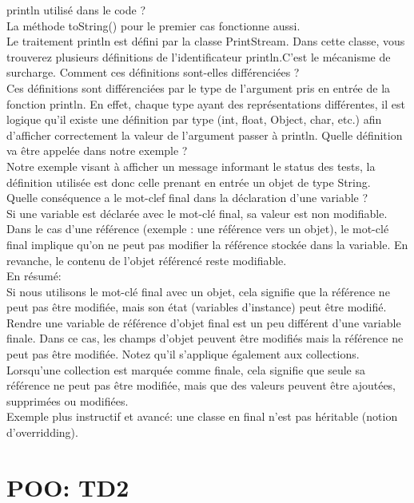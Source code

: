 \documentclass{article}
\begin{document}
println utilisé dans le code ?\\
La méthode toString() pour le premier cas fonctionne aussi.\\
Le traitement println est défini par la classe PrintStream.
Dans cette classe, vous trouverez plusieurs définitions de l’identificateur println.\newline C’est le mécanisme de surcharge.\newline
Comment ces définitions sont-elles différenciées ?\\
Ces définitions sont différenciées par le type de l’argument pris en entrée de la fonction println. En effet, chaque type ayant des représentations différentes, il est logique qu’il existe une définition par type (int, float, Object, char, etc.) afin d’afficher correctement la valeur de l’argument passer à println.
Quelle définition va être appelée dans notre exemple ?\\
Notre exemple visant à afficher un message informant le status des tests, la définition
utilisée est donc celle prenant en entrée un objet de type String.\\
Quelle conséquence a le mot-clef final dans la déclaration d’une variable ?\\
Si une variable est déclarée avec le mot-clé final, sa valeur est non modifiable. Dans le
cas d’une référence (exemple : une référence vers un objet), le mot-clé final implique
qu’on ne peut pas modifier la référence stockée dans la variable. En revanche, le contenu de l’objet référencé reste modifiable.\\
En résumé:\\
Si nous utilisons le mot-clé final avec un objet, cela signifie que la référence ne peut pas être modifiée, mais son état (variables d'instance) peut être modifié.
\\
Rendre une variable de référence d'objet final est un peu différent d'une variable finale. Dans ce cas, les champs d'objet peuvent être modifiés mais la référence ne peut pas être modifiée. Notez qu'il s'applique également aux collections.
\\
Lorsqu'une collection est marquée comme finale, cela signifie que seule sa référence ne peut pas être modifiée, mais que des valeurs peuvent être ajoutées, supprimées ou modifiées.\\
Exemple plus instructif et avancé: une classe en final n'est pas héritable (notion d'overridding).
\newline
\newline
\section{POO: TD2}
\end{document}
